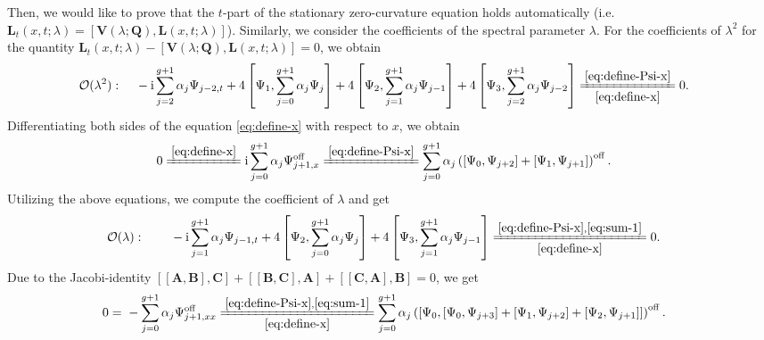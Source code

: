 \documentclass[11pt,reqno]{amsart}
\newcommand{\ii}{\mathrm{i}}
\newcommand{\off}{\mathrm{off}}
\numberwithin{equation}{section}
\begin{document}
\begin{proof-prop-matrix-L}
	Then, we would like to prove that the $t$-part of the stationary zero-curvature equation holds automatically (i.e. $\mathbf{L}_t(x,t;\lambda)=[\mathbf{V}(\lambda;\mathbf{Q}),\mathbf{L}(x,t;\lambda)]$).
	Similarly, we consider the coefficients of the spectral parameter $\lambda$.
	For the coefficients of $\lambda^2$ for the quantity $\mathbf{L}_t(x,t;\lambda)-[\mathbf{V}(\lambda;\mathbf{Q}),\mathbf{L}(x,t;\lambda)]=0$, we obtain
	\begin{equation}\nonumber
		\begin{split}
			\mathcal{O}(\lambda^2): \quad 
			& \ -\ii \sum_{j=2}^{g+1}\alpha_j \Psi_{j-2,t}+4\left[ \Psi_1,\sum_{j=0}^{g+1}\alpha_j\Psi_{j}\right]+4\left[ \Psi_2,\sum_{j=1}^{g+1}\alpha_j\Psi_{j-1}\right]+4\left[ \Psi_3,\sum_{j=2}^{g+1}\alpha_j\Psi_{j-2}\right] \xlongequal[\eqref{eq:define-x}]{\eqref{eq:define-Psi-x}}0.
	\end{split}
	\end{equation}
Differentiating both sides of the equation \eqref{eq:define-x} with respect to $x$, we obtain 
\begin{equation}\label{eq:sum-1}
	\begin{split}
		&0\xlongequal{\eqref{eq:define-x}}\ii\sum_{j=0}^{g+1}\alpha_j\Psi_{j+1,x}^{\off}\xlongequal{\eqref{eq:define-Psi-x}} \sum_{j=0}^{g+1}\alpha_j\left([\Psi_0,\Psi_{j+2}]+[\Psi_1,\Psi_{j+1}]\right)^{\off}.
	\end{split}
\end{equation}
Utilizing the above equations, we compute the coefficient of $\lambda$ and get
\begin{equation}\nonumber
	\begin{split}
		\mathcal{O}(\lambda): \qquad 
		& \ -\ii \sum_{j=1}^{g+1}\alpha_j \Psi_{j-1,t}+4\left[ \Psi_2,\sum_{j=0}^{g+1}\alpha_j\Psi_{j}\right]+4\left[ \Psi_3,\sum_{j=1}^{g+1}\alpha_j\Psi_{j-1}\right] 
		\xlongequal[\eqref{eq:define-x}]{\eqref{eq:define-Psi-x},\eqref{eq:sum-1}} 0.
	\end{split}
\end{equation}
Due to the Jacobi-identity $[[\mathbf{A},\mathbf{B}],\mathbf{C}]+[[\mathbf{B},\mathbf{C}],\mathbf{A}]+[[\mathbf{C},\mathbf{A}],\mathbf{B}]=0$, we get
\begin{equation}\nonumber
		\begin{split}
			0=&\ -\sum_{j=0}^{g+1}\alpha_j\Psi_{j+1,xx}^{\off}
			\xlongequal[\eqref{eq:define-x}]{\eqref{eq:define-Psi-x}, \eqref{eq:sum-1}}
			  \sum_{j=0}^{g+1}\alpha_j \left([\Psi_0,[\Psi_0,\Psi_{j+3}]+[\Psi_1,\Psi_{j+2}]+[\Psi_2,\Psi_{j+1}]]\right)^{\off}.

\end{split}
\end{equation}
\end{proof-prop-matrix-L}
\end{document}
